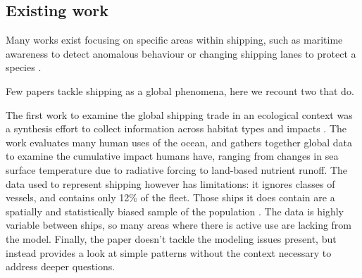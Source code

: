 


\subsection{Existing work}

Many works exist focusing on specific areas within shipping, such as maritime awareness to detect anomalous behaviour \cite{Tun2007} or changing shipping lanes to protect a species \cite{Lagueux2011,Mckenna2012a}. %

 Few papers tackle shipping as a global phenomena, here we recount two that do.

The first work %
to examine the global shipping trade in an ecological context was a synthesis effort to collect information across habitat types and impacts \citep{Halpern2008}. The work evaluates many human uses of the ocean, and gathers together global data to examine the cumulative impact humans have, ranging from changes in sea surface temperature due to radiative forcing to land-based nutrient runoff. The data used to represent shipping however has limitations: it ignores classes %
 of vessels, and contains only 12\% of the fleet. Those ships it does contain are a spatially and statistically biased sample of the population \citep{Wang2007}. The data is highly variable between ships, so many areas where there is active use are lacking from the model. Finally, the paper doesn't tackle the modeling issues present, but instead provides a look at simple patterns without the context necessary to address deeper questions. %

